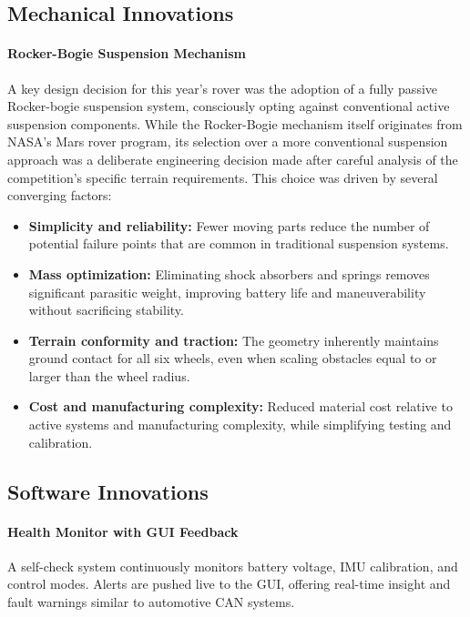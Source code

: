\documentclass[12pt,a4paper,twocolumn]{article}
\begin{document}
\subsection{Mechanical Innovations}
\label{sec:mechanical-innovations} 
\paragraph{Rocker-Bogie Suspension Mechanism}
A key design decision for this year's rover was the adoption of a fully passive Rocker-bogie suspension system, consciously opting against conventional active suspension components. While the Rocker-Bogie mechanism itself originates from NASA's Mars rover program, its selection over a more conventional suspension approach was a deliberate engineering decision made after careful analysis of the competition's specific terrain requirements. This choice was driven by several converging factors:

\begin{itemize}
\item \textbf{Simplicity and reliability:} Fewer moving parts reduce the number of potential failure points that are common in traditional suspension systems.
\item \textbf{Mass optimization:} Eliminating shock absorbers and springs removes significant parasitic weight, improving battery life and maneuverability without sacrificing stability.
\item \textbf{Terrain conformity and traction:} The geometry inherently maintains ground contact for all six wheels, even when scaling obstacles equal to or larger than the wheel radius.
\item \textbf{Cost and manufacturing complexity:} Reduced material cost relative to active systems and manufacturing complexity, while simplifying testing and calibration.
\end{itemize}

\subsection{Software Innovations}

\paragraph{Health Monitor with GUI Feedback}
A self-check system continuously monitors battery voltage, IMU calibration, and control modes.
Alerts are pushed live to the GUI, offering real-time insight and fault warnings similar to automotive CAN systems.
\end{document}
